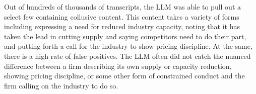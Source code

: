 Out of hundreds of thousands of transcripts, the LLM was able to pull out a select few containing collusive content. 
This content takes a variety of forms including expressing a need for reduced industry capacity, noting that it has 
taken the lead in cutting supply and saying competitors need to do their part, and putting forth a call for the 
industry to show pricing discipline. At the same, there is a high rate of false positives. The LLM often did not 
catch the nuanced difference between a firm describing its own supply or capacity reduction, showing pricing 
discipline, or some other form of constrained conduct and the firm calling on the industry to do so.

